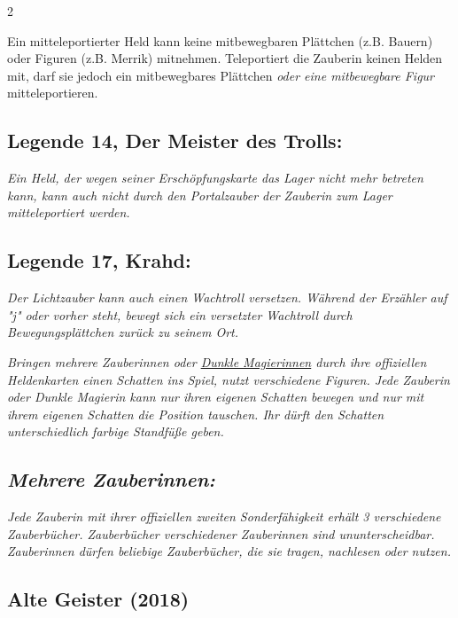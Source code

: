 \documentclass[10pt, a4paper, oneside]{book}
\newcommand{\fan}[1]{\textit{#1}}
\begin{document}
\begin{multicols*}{2}
\begin{bgcolor}
Ein mitteleportierter Held kann keine mitbewegbaren Plättchen (z.B. Bauern) oder Figuren (z.B. Merrik) mitnehmen. Teleportiert die Zauberin keinen Helden mit, darf sie jedoch ein mitbewegbares Plättchen \fan{oder eine mitbewegbare Figur} mitteleportieren.\supercite{41284} 




\subsection{Legende 14, Der Meister des Trolls:}

\fan{Ein Held, der wegen seiner Erschöpfungskarte das Lager nicht mehr betreten kann, kann auch nicht durch den Portalzauber der Zauberin zum Lager mitteleportiert werden.}







\subsection{Legende 17, Krahd:}

\fan{Der Lichtzauber kann auch einen Wachtroll versetzen. Während der Erzähler auf "j" oder vorher steht, bewegt sich ein versetzter Wachtroll durch Bewegungsplättchen zurück zu seinem Ort.}

\fan{Bringen mehrere Zauberinnen oder \hyperref[Dunkle Magierin]{Dunkle Magierinnen} durch ihre offiziellen Heldenkarten einen Schatten ins Spiel, nutzt verschiedene Figuren. Jede Zauberin oder Dunkle Magierin kann nur ihren eigenen Schatten bewegen und nur mit ihrem eigenen Schatten die Position tauschen. Ihr dürft den Schatten unterschiedlich farbige Standfüße geben.}



\subsection{\fan{Mehrere Zauberinnen:}}
\fan{Jede Zauberin mit ihrer offiziellen zweiten Sonderfähigkeit erhält 3 verschiedene Zauberbücher. Zauberbücher verschiedener Zauberinnen sind ununterscheidbar. Zauberinnen dürfen beliebige Zauberbücher, die sie tragen, nachlesen oder nutzen.}

\end{bgcolor}




\begin{bgcolor}[color-AG]
\section{Alte Geister (2018)}


\end{bgcolor}
\end{multicols*}
\end{document}
